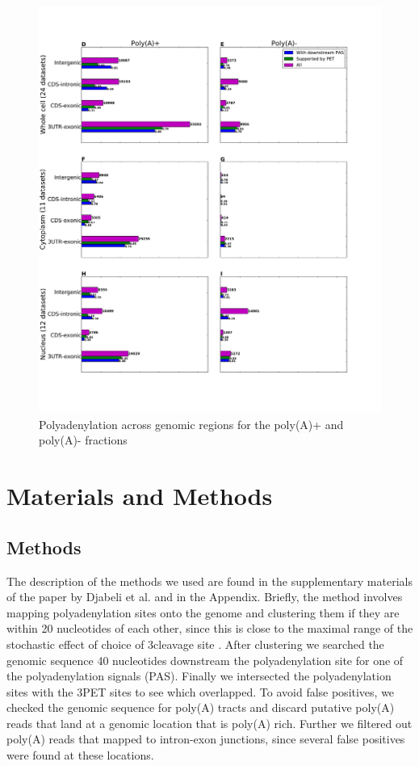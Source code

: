 \begin{figure}[hb]
	\begin{center}
		\includegraphics[scale=0.4]{figures/polyadenylation/Sidebars_pA_2+.pdf}
	\end{center}
	\caption{Polyadenylation across genomic regions for the poly(A)+ and poly(A)-
	fractions}
	\label{fig:sidebars}
\end{figure}

\section{Materials and Methods}
\subsection{Methods}
The description of the methods we used are found in the supplementary materials
of the paper by Djabeli et al. and in the Appendix. Briefly, the method
involves mapping polyadenylation sites onto the genome and clustering them if
they are within 20 nucleotides of each other, since this is close to the
maximal range of the stochastic effect of choice of 3\p cleavage site
\cite{tian_large-scale_2005}. After clustering we searched the genomic sequence
40 nucleotides downstream the polyadenylation site for one of the
polyadenylation signals (PAS). Finally we intersected the polyadenylation sites
with the 3\p PET sites to see which overlapped. To avoid false positives, we
checked the genomic sequence for poly(A) tracts and discard putative poly(A)
reads that land at a genomic location that is poly(A) rich. Further we filtered
out poly(A) reads that mapped to intron-exon junctions, since several false
positives were found at these locations.

